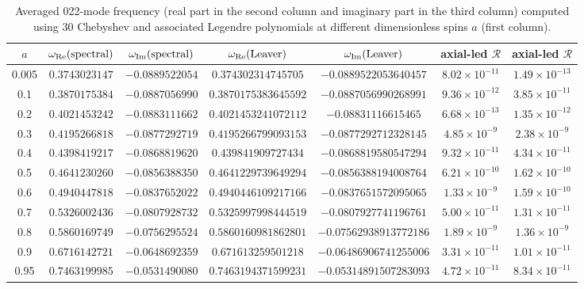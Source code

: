 \documentclass[aps,prx,amsmath,floats,floatfix,twocolumn,
  superscriptaddress,nofootinbib,showpacs]{revtex4-1}
\begin{document}
\begin{table}[htb]
\begin{tabular}{c|cc|cc|c|c}
\hline
$a$ & $\omega_{\rm Re} (\rm spectral)$ & $\omega_{\rm Im} (\rm spectral)$ & $\omega_{\rm Re} (\rm Leaver)$ & $\omega_{\rm Im} (\rm Leaver)$ & axial-led $\mathcal{R}$ & axial-led $\mathcal{R}$ \\ \hline
0.005 & $0.3743023147$ & $-0.0889522054$ & $0.374302314745705$ & $-0.0889522053640457$ & $8.02\times 10^{-11}$ & $1.49\times 10^{-13}$ \\
0.1 & $0.3870175384$ & $-0.0887056990$ & $0.3870175383645592$ & $-0.0887056990268991$ & $9.36\times 10^{-12}$ & $3.85\times 10^{-11}$ \\
0.2 & $0.4021453242$ & $-0.0883111662$ & $0.4021453241072112$ & $-0.08831116615465$ & $6.68\times 10^{-13}$ & $1.35\times 10^{-12}$ \\
0.3 & $0.4195266818$ & $-0.0877292719$ & $0.4195266799093153$ & $-0.0877292712328145$ & $4.85\times 10^{-9}$ & $2.38\times 10^{-9}$ \\
0.4 & $0.4398419217$ & $-0.0868819620$ & $0.439841909727434$ & $-0.0868819580547294$ & $9.32\times 10^{-11}$ & $4.34\times 10^{-11}$ \\
0.5 & $0.4641230260$ & $-0.0856388350$ & $0.4641229739649294$ & $-0.0856388194008764$ & $6.21\times 10^{-10}$ & $1.62\times 10^{-10}$ \\
0.6 & $0.4940447818$ & $-0.0837652022$ & $0.4940446109217166$ & $-0.0837651572095065$ & $1.33\times 10^{-9}$ & $1.59\times 10^{-10}$ \\
0.7 & $0.5326002436$ & $-0.0807928732$ & $0.5325997998444519$ & $-0.0807927741196761$ & $5.00\times 10^{-11}$ & $1.31\times 10^{-11}$ \\
0.8 & $0.5860169749$ & $-0.0756295524$ & $0.5860160981862801$ & $-0.07562938913772186$ & $1.89\times 10^{-9}$ & $1.36\times 10^{-9}$ \\
0.9 & $0.6716142721$ & $-0.0648692359$ & $0.671613259501218$ & $-0.06486906741255006$ & $3.31\times 10^{-11}$ & $1.01\times 10^{-11}$ \\
0.95 & $0.7463199985$ & $-0.0531490080$ & $0.7463194371599231$ & $-0.05314891507283093$ & $4.72\times 10^{-11}$ & $8.34\times 10^{-11}$ \\ \hline
\end{tabular}
\caption{
\label{tab:results}
Averaged 022-mode frequency (real part in the second column and imaginary part in the third column) computed using 30 Chebyshev and associated Legendre polynomials at different dimensionless spins $a$ (first column). 
}
\end{table}
\end{document}
